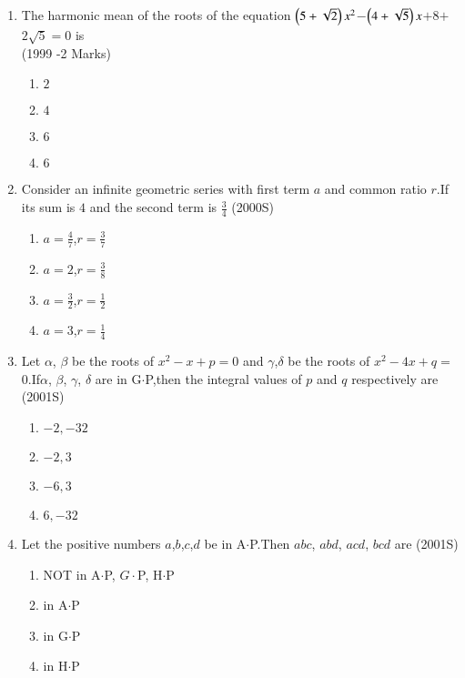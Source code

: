 \documentclass[journal,12pt,twocolumn]{IEEEtran}
\theoremstyle{remark}
\begin{document}
\begin{enumerate} [start=5]
\begin{enumerate}
        \item $3$
        \item $5$
        \item $6$
    \end{enumerate}
    \item The harmonic mean of the roots of the equation $\left(5+\sqrt{2}\right)x^2$$-$$\left(4+\sqrt{5}\right)x$$+$$8$$+$$2\sqrt{5}$$=$$0$ is \\
    \hfill(1999 -2 Marks)
    \begin{enumerate}
        \item $2$
        \item $4$
        \item $6$
        \item $6$
    \end{enumerate}
    \item Consider an infinite geometric series with first term $a$ and common ratio $r$.If its sum is $4$ and the second term is $\frac{3}{4}$
    \hfill(2000S)
    \begin{enumerate}
        \item $a=\frac{4}{7}$,$r=\frac{3}{7}$
        \item $a=2$,$r=\frac{3}{8}$
        \item $a=\frac{3}{2}$,$r=\frac{1}{2}$
        \item $a=3$,$r=\frac{1}{4}$
    \end{enumerate}
    \item Let $\alpha$, $\beta$ be the roots of $x^2-x+p$$=$$0$ and $\gamma $,$\delta$ be the roots of $x^2-4x+q$$=$$0$.If$ \alpha$, $\beta$, $\gamma$, $\delta$ are in G$\cdot$P,then the integral values of $p$ and $q$ respectively are
    \hfill(2001S)
    \begin{enumerate}
        \item $-2,-32$
        \item $-2,3$
       \item $-6,3$
        \item $6,-32$
    \end{enumerate}
    \item Let the positive numbers $a$,$b$,$c$,$d$ be in A$\cdot$P.Then $abc$, $abd$, $acd$, $bcd$ are
    \hfill(2001S)
    \begin{enumerate}
        \item NOT  in A$\cdot$P, $G\cdot$P, H$\cdot $P
        \item in A$\cdot$P
        \item in G$\cdot$P
        \item in H$\cdot$P

\end{enumerate}
\end{enumerate}
\end{document}
